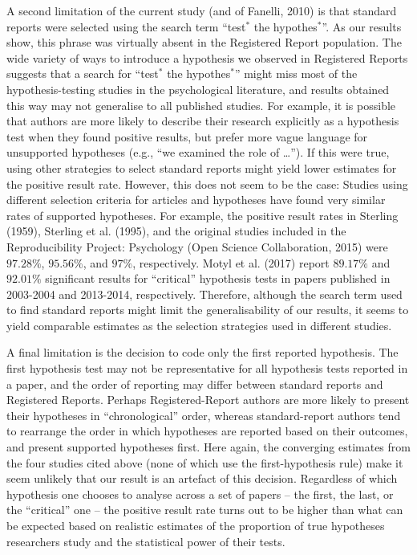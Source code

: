 \documentclass[british,,jou,floatsintext]{apa6}
\begin{document}
A second limitation of the current study (and of Fanelli, 2010) is that standard reports were selected using the search term \enquote{test\(^\ast\) the hypothes\(^\ast\)}.
As our results show, this phrase was virtually absent in the Registered Report population.
The wide variety of ways to introduce a hypothesis we observed in Registered Reports suggests that a search for \enquote{test\(^\ast\) the hypothes\(^\ast\)} might miss most of the hypothesis-testing studies in the psychological literature, and results obtained this way may not generalise to all published studies.
For example, it is possible that authors are more likely to describe their research explicitly as a hypothesis test when they found positive results, but prefer more vague language for unsupported hypotheses (e.g., \enquote{we examined the role of \ldots{}}).
If this were true, using other strategies to select standard reports might yield lower estimates for the positive result rate.
However, this does not seem to be the case:
Studies using different selection criteria for articles and hypotheses have found very similar rates of supported hypotheses.
For example, the positive result rates in Sterling (1959), Sterling et al. (1995), and the original studies included in the Reproducibility Project: Psychology (Open Science Collaboration, 2015) were \(97.28\%\), \(95.56\%\), and \(97\%\), respectively.
Motyl et al. (2017) report \(89.17\%\) and \(92.01\%\) significant results for \enquote{critical} hypothesis tests in papers published in 2003-2004 and 2013-2014, respectively.
Therefore, although the search term used to find standard reports might limit the generalisability of our results, it seems to yield comparable estimates as the selection strategies used in different studies.

A final limitation is the decision to code only the first reported hypothesis.
The first hypothesis test may not be representative for all hypothesis tests reported in a paper, and the order of reporting may differ between standard reports and Registered Reports.
Perhaps Registered-Report authors are more likely to present their hypotheses in \enquote{chronological} order, whereas standard-report authors tend to rearrange the order in which hypotheses are reported based on their outcomes, and present supported hypotheses first.
Here again, the converging estimates from the four studies cited above (none of which use the first-hypothesis rule) make it seem unlikely that our result is an artefact of this decision.
Regardless of which hypothesis one chooses to analyse across a set of papers -- the first, the last, or the \enquote{critical} one -- the positive result rate turns out to be higher than what can be expected based on realistic estimates of the proportion of true hypotheses researchers study and the statistical power of their tests.
\end{document}
